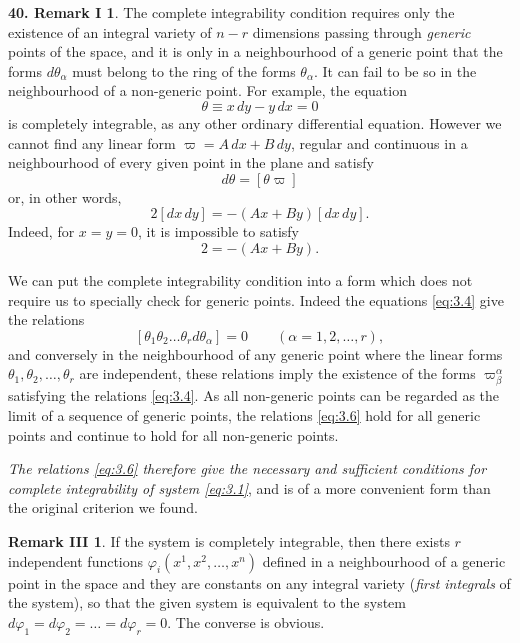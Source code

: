 \documentclass[leqno,11pt]{book}
\numberwithin{equation}{chapter}
\theoremstyle{shape1}
\theoremstyle{shape0}
\theoremstyle{shape2}
\theoremstyle{definition}
\begin{document}
\vspace{12pt}\addtocounter{frenchsec}{1}
\theoremstyle{shape0}
\newtheorem*{rmk40}{\hspace{15pt}\textbf{40.} Remark I}
\begin{rmk40}
  The complete integrability condition requires only the existence of an integral variety of $n-r$ dimensions passing through  \emph{generic} points of the space, and it is only in a neighbourhood of a generic point that the forms $d\theta_{\alpha}$ must belong to the ring of the forms $\theta_{\alpha}$. It can fail to be so in the neighbourhood of a non-generic point. For example, the equation
\[
\theta\equiv x\,dy-y\,dx=0
\]
is completely integrable, as any other ordinary differential equation. However we cannot find any linear form $\varpi=A\,dx+B\,dy$, regular and continuous in a neighbourhood of every given point in the plane and satisfy
\[
d\theta=[\theta\varpi]
\]
or, in other words,
\[
2[dx\,dy]=-(Ax+By)[dx\,dy].
\]
Indeed, for $x=y=0$, it is impossible to satisfy
\[
2=-(Ax+By).
\]
\begin{rmkii}
  We can put the complete integrability condition into a form which does not require us to specially check  for generic points. Indeed the equations \eqref{eq:3.4} give the relations
  \begin{equation}
    \label{eq:3.6}
    [\theta_{1}\theta_{2}\dots\theta_{r}d\theta_{\alpha}]=0\qquad(\alpha=1,2,\dots,r),
  \end{equation}
and conversely in the neighbourhood of any generic point where the linear forms $\theta_{1},\theta_{2},\dots,\theta_{r}$ are independent, these relations imply the existence of the forms $\varpi^{\alpha}_{\beta}$ satisfying the relations \eqref{eq:3.4}. As all non-generic points can be regarded as the limit of a sequence of generic points, the relations \eqref{eq:3.6} hold for all generic points and continue to hold for all non-generic points.

\emph{The relations \eqref{eq:3.6} therefore give the necessary and sufficient conditions for complete integrability of system \eqref{eq:3.1}}, and is of a more convenient form than the original criterion  we  found.
\end{rmkii}

\newtheorem*{rmkiii}{\hspace{15pt}Remark III}

\begin{rmkiii}
  If the system is completely integrable, then there exists $r$ independent functions $\varphi_{i}(x^{1},x^{2},\dots,x^{n})$ defined in a neighbourhood of a generic point in the space and they are constants on any integral variety (\emph{first integrals} of the system), so that the given system is equivalent to the system $d\varphi_{1}=d\varphi_{2}=\dots=d\varphi_{r}=0$. The converse is obvious.
\end{rmkiii}
\end{rmk40}
\end{document}
